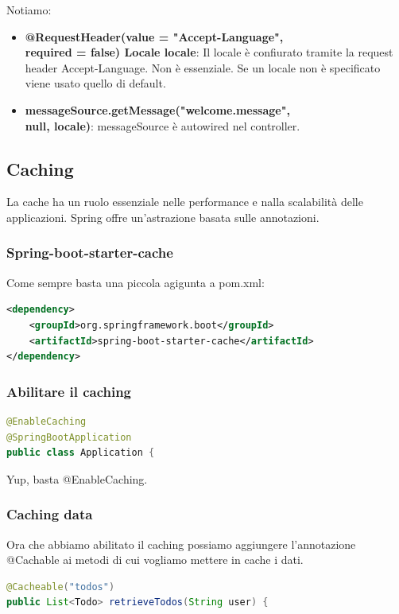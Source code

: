 \documentclass[11pt,a4paper]{book}
\begin{document}
Notiamo:
\begin{itemize}
	\item \textbf{@RequestHeader(value = "Accept-Language", \\
		required = false) Locale locale}: Il locale è confiurato tramite la request header Accept-Language. Non è essenziale. Se un locale non è specificato viene usato quello di default.
	\item \textbf{messageSource.getMessage("welcome.message", \\
		null, locale)}: messageSource è autowired nel controller. 
\end{itemize}

\subsection{Caching}
La cache ha un ruolo essenziale nelle performance e nalla scalabilità delle applicazioni. Spring offre un'astrazione basata sulle annotazioni.

\subsubsection{Spring-boot-starter-cache}
Come sempre basta una piccola agigunta a pom.xml:
\begin{lstlisting}[language = XML]
<dependency>
	<groupId>org.springframework.boot</groupId>
	<artifactId>spring-boot-starter-cache</artifactId>
</dependency>
\end{lstlisting}

\subsubsection{Abilitare il caching}
\begin{lstlisting}[language = Java]
@EnableCaching
@SpringBootApplication
public class Application {
\end{lstlisting}

Yup, basta @EnableCaching.

\subsubsection{Caching data}
Ora che abbiamo abilitato il caching possiamo aggiungere l'annotazione @Cachable ai metodi di cui vogliamo mettere in cache i dati. 
\begin{lstlisting}[language = Java]
@Cacheable("todos")
public List<Todo> retrieveTodos(String user) {
\end{lstlisting}
\end{document}
